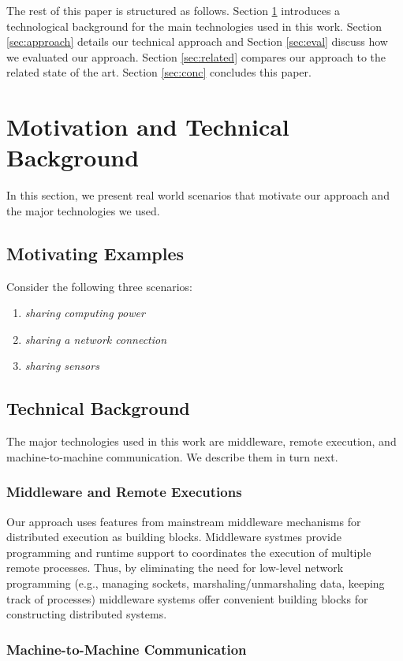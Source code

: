 \documentclass[conference]{IEEEtran}
\begin{document}
The rest of this paper is structured as follows. Section \ref{sec:background} introduces a technological background for the main technologies used in this work. Section \ref{sec:approach} details our technical approach and Section \ref{sec:eval} discuss how we evaluated our approach. Section \ref{sec:related} compares our approach to the related state of the art. Section \ref{sec:conc} concludes this paper.

 

\section{Motivation and Technical Background}
\label{sec:background}
In this section, we present real world scenarios that motivate our approach and the major technologies we used.

\subsection{Motivating Examples}
Consider the following three scenarios:
\begin{enumerate}
\item \emph{sharing computing power} 
\item \emph{sharing a network connection}
\item \emph{sharing sensors}
\end{enumerate}

\subsection{Technical Background}
The major technologies used in this work are middleware, remote execution, and machine-to-machine communication. We describe them in turn next.

\subsubsection{Middleware and Remote Executions}
Our approach uses features from mainstream middleware mechanisms for distributed execution as building blocks. Middleware systmes provide programming and runtime support to coordinates the execution of multiple remote processes. 
Thus, by eliminating the need for low-level network programming (e.g., managing sockets, marshaling/unmarshaling data, keeping track of processes) middleware systems offer convenient building blocks for constructing distributed systems. 

\subsubsection{Machine-to-Machine Communication}
\end{document}
